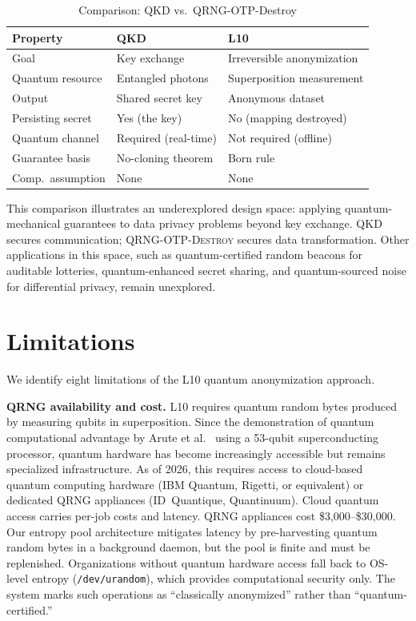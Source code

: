 \documentclass[journal]{IEEEtran}
\begin{document}
\begin{table}[t]
\caption{Comparison: QKD vs.\ QRNG-OTP-Destroy}
\label{tab:qkd_vs_l10}
\begin{center}
\footnotesize
\begin{tabular}{@{}lll@{}}
\toprule
\textbf{Property} & \textbf{QKD} & \textbf{L10} \\
\midrule
Goal & Key exchange & Irreversible anonymization \\
Quantum resource & Entangled photons & Superposition measurement \\
Output & Shared secret key & Anonymous dataset \\
Persisting secret & Yes (the key) & No (mapping destroyed) \\
Quantum channel & Required (real-time) & Not required (offline) \\
Guarantee basis & No-cloning theorem & Born rule \\
Comp.\ assumption & None & None \\
\bottomrule
\end{tabular}
\end{center}
\end{table}

This comparison illustrates an underexplored design space: applying quantum-mechanical guarantees to data privacy problems beyond key exchange. QKD secures communication; \textsc{QRNG-OTP-Destroy} secures data transformation. Other applications in this space, such as quantum-certified random beacons for auditable lotteries, quantum-enhanced secret sharing, and quantum-sourced noise for differential privacy, remain unexplored.

\section{Limitations}
\label{sec:limitations}

We identify eight limitations of the L10 quantum anonymization approach.

\textbf{QRNG availability and cost.} L10 requires quantum random bytes produced by measuring qubits in superposition. Since the demonstration of quantum computational advantage by Arute et al.~\cite{arute2019supremacy} using a 53-qubit superconducting processor, quantum hardware has become increasingly accessible but remains specialized infrastructure. As of 2026, this requires access to cloud-based quantum computing hardware (IBM Quantum, Rigetti, or equivalent) or dedicated QRNG appliances (ID~Quantique, Quantinuum). Cloud quantum access carries per-job costs and latency. QRNG appliances cost \$3{,}000--\$30{,}000. Our entropy pool architecture mitigates latency by pre-harvesting quantum random bytes in a background daemon, but the pool is finite and must be replenished. Organizations without quantum hardware access fall back to OS-level entropy (\texttt{/dev/urandom}), which provides computational security only. The system marks such operations as ``classically anonymized'' rather than ``quantum-certified.''
\end{document}
